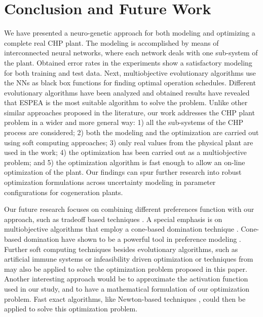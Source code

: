 \section{Conclusion and Future Work}

We have presented a neuro-genetic approach for both modeling and optimizing a complete real CHP plant. The modeling is accomplished by means of interconnected neural networks, where each network deals with one sub-system of the plant. Obtained error rates in the experiments show a satisfactory modeling for both training and test data. Next, multiobjective evolutionary algorithms use the NNs as black box functions for finding optimal operation schedules. Different evolutionary algorithms have been analyzed and obtained results have revealed that ESPEA is the most suitable algorithm to solve the problem. Unlike other similar approaches proposed in the literature, our work addresses the CHP plant problem in a wider and more general way: 1) all the sub-systems of the CHP process are considered; 2) both the modeling and the optimization are carried out using soft computing approaches; 3) only real values from the physical plant are used in the work; 4) the optimization has been carried out as a multiobjective problem; and 5) the optimization algorithm is fast enough to allow an on-line optimization of the plant. Our findings can spur further research into robust optimization formulations across uncertainty modeling in parameter configurations for cogeneration plants.

Our future research focuses on combining different preferences function with our approach, such as tradeoff based techniques \cite{palgos,properKnee,shukla2010framework,shukla2012towards}. A special emphasis is on multiobjective algorithms that employ a cone-based domination technique \cite{hirsch2011variable,shukla2013indicator}. Cone-based domination have shown to be a powerful tool in preference modeling \cite{wiecek2007advances,emmerich2013cone,shukla2013theoretical}. Further soft computing techniques besides evolutionary algorithms, such as artificial immune systems \cite{shang2012clonal} or infeasibility driven optimization \cite{Jiao2014363} or techniques from \cite{Shang2014609,Shang2014343} may also be applied to solve the optimization problem proposed in this paper. Another interesting approach would be to approximate the activation function used in our study, and to have  a mathematical formulation of our optimization problem. Fast exact algorithms, like Newton-based techniques \cite{fischer2008levenberg}, could then be applied to solve this optimization problem. 
